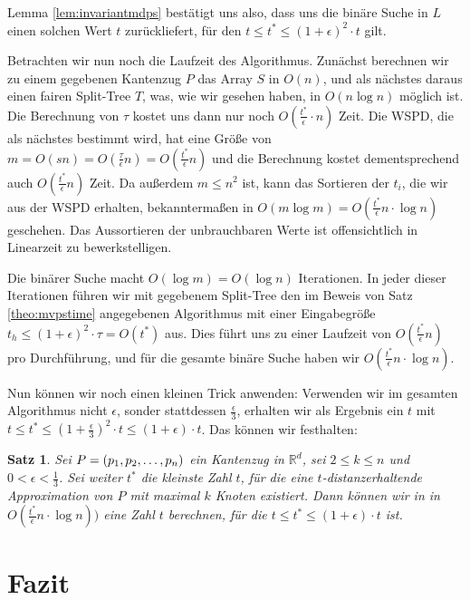 \documentclass[11pt]{article}
\newcommand{\R}{\mathbb{R}}
\newtheorem{theorem}{Satz}[section]
\begin{document}
	Lemma \ref{lem:invariantmdps} bestätigt uns also, dass uns die binäre Suche in $L$ einen solchen Wert $t$ zurückliefert, für den $t \leq t^* \leq (1 + \epsilon)^2 \cdot t$ gilt.
	
	Betrachten wir nun noch die Laufzeit des Algorithmus.
	Zunächst berechnen wir zu einem gegebenen Kantenzug $P$ das Array $S$ in $O(n)$, und als nächstes daraus einen fairen Split-Tree $T$, was, wie wir gesehen haben, in $O(n \log n)$ möglich ist. 
	Die Berechnung von $\tau$ kostet uns dann nur noch $O(\frac{t^*}{\epsilon} \cdot n)$ Zeit. 
	Die WSPD, die als nächstes bestimmt wird, hat eine Größe von $m = O(sn) = O(\frac{\tau}{\epsilon}n) = O(\frac{t^*}{\epsilon}n)$ und die Berechnung kostet dementsprechend auch $O(\frac{t^*}{\epsilon}n)$ Zeit. 
	Da außerdem $m \leq n^2$ ist, kann das Sortieren der $t_i$, die wir aus der WSPD erhalten, bekanntermaßen in $O(m \log m) = O(\frac{t^*}{\epsilon}n \cdot \log n)$ geschehen. 
	Das Aussortieren der unbrauchbaren Werte ist offensichtlich in Linearzeit zu bewerkstelligen. 
	
	Die binärer Suche macht $O(\log m) = O(\log n)$ Iterationen. 
	In jeder dieser Iterationen führen wir mit gegebenem Split-Tree den im Beweis von Satz \ref{theo:mvpstime} angegebenen Algorithmus mit einer Eingabegröße $t_h \leq (1 + \epsilon)^2 \cdot \tau = O(t^*)$ aus. 
	Dies führt uns zu einer Laufzeit von $O(\frac{t^*}{\epsilon}n)$ pro Durchführung, und für die gesamte binäre Suche haben wir $O(\frac{t^*}{\epsilon}n \cdot \log n)$.
	
	Nun können wir noch einen kleinen Trick anwenden: Verwenden wir im gesamten Algorithmus nicht $\epsilon$, sonder stattdessen $\frac{\epsilon}{3}$, erhalten wir als Ergebnis ein $t$ mit $t \leq t^* \leq (1 + \frac{\epsilon}{3})^2 \cdot t \leq (1 + \epsilon)\cdot t$. Das können wir festhalten:
	
	\begin{theorem}
		Sei $P = (p_1, p_2, \mathellipsis, p_n)$ ein Kantenzug in $\R^d$, sei $2 \leq k \leq n$ und $0 < \epsilon < \frac{1}{3}$. 
		Sei weiter $t^*$ die kleinste Zahl $t$, für die eine $t$-distanzerhaltende Approximation von $P$ mit maximal $k$ Knoten existiert.
		Dann können wir in in $O(\frac{t^*}{\epsilon}n \cdot \log n))$ eine Zahl $t$ berechnen, für die $t \leq t^* \leq (1 + \epsilon)\cdot t$ ist.
	\end{theorem}
	
	\section{Fazit}
    \label{sec:fazit}
    
\end{document}
